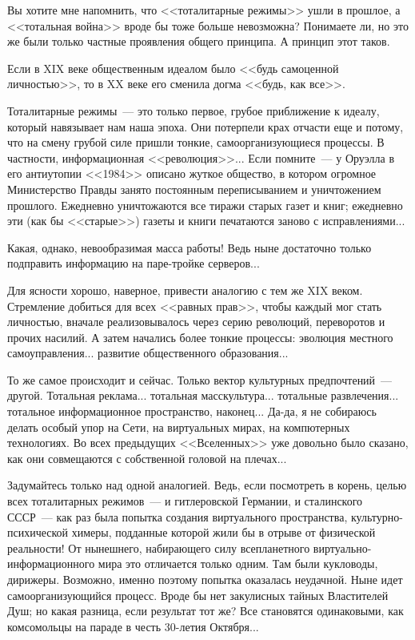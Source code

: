 \documentclass{scrbook}
\newcommand{\flqq}{<<}
\newcommand{\frqq}{>>}
\newcommand{\mdash}{~--- }
\begin{document}
Вы хотите мне напомнить, что {\flqq}тоталитарные режимы{\frqq} ушли в прошлое, а {\flqq}тотальная война{\frqq} вроде бы тоже больше невозможна? Понимаете ли, но это же были только частные проявления общего принципа. А принцип этот таков.

Если в XIX веке общественным идеалом было {\flqq}будь самоценной личностью{\frqq}, то в XX веке его сменила догма {\flqq}будь, как все{\frqq}.

Тоталитарные режимы{\mdash}это только первое, грубое приближение к идеалу, который навязывает нам наша эпоха. Они потерпели крах отчасти еще и потому, что на смену грубой силе пришли тонкие, самоорганизующиеся процессы. В частности, информационная {\flqq}революция{\frqq}... Если помните{\mdash}у Оруэлла в его антиутопии {\flqq}1984{\frqq} описано жуткое общество, в котором огромное Министерство Правды занято постоянным переписыванием и уничтожением прошлого. Ежедневно уничтожаются все тиражи старых газет и книг; ежедневно эти (как бы {\flqq}старые{\frqq}) газеты и книги печатаются заново с исправлениями...

Какая, однако, невообразимая масса работы! Ведь ныне достаточно только подправить информацию на паре-тройке серверов...

Для ясности хорошо, наверное, привести аналогию с тем же XIX веком. Стремление добиться для всех {\flqq}равных прав{\frqq}, чтобы каждый мог стать личностью, вначале реализовывалось через серию революций, переворотов и прочих насилий. А затем начались более тонкие процессы: эволюция местного самоуправления... развитие общественного образования...

То же самое происходит и сейчас. Только вектор культурных предпочтений{\mdash}другой. Тотальная реклама... тотальная масскультура... тотальные развлечения... тотальное информационное пространство, наконец... Да-да, я не собираюсь делать особый упор на Сети, на виртуальных мирах, на компютерных технологиях. Во всех предыдущих {\flqq}Вселенных{\frqq} уже довольно было сказано, как они совмещаются с собственной головой на плечах...

Задумайтесь только над одной аналогией. Ведь, если посмотреть в корень, целью всех тоталитарных режимов{\mdash}и гитлеровской Германии, и сталинского СССР{\mdash}как раз была попытка создания виртуального пространства, культурно-психической химеры, подданные которой жили бы в отрыве от физической реальности! От нынешнего, набирающего силу всепланетного виртуально-информационного мира это отличается только одним. Там были кукловоды, дирижеры. Возможно, именно поэтому попытка оказалась неудачной. Ныне идет самоорганизующийся процесс. Вроде бы нет закулисных тайных Властителей Душ; но какая разница, если результат тот же? Все становятся одинаковыми, как комсомольцы на параде в честь 30-летия Октября...
\end{document}
